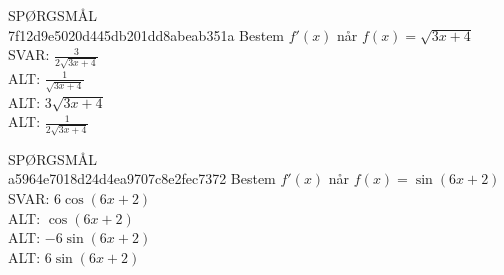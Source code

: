 \documentclass[]{article}
\newcounter{spgcounter}
\newenvironment{question}[2]{\addtocounter{spgcounter}{1} SPØRGSMÅL \thespgcounter\\}{\hspace{50px}}
\newcommand{\answer}[1]{{\color{green} SVAR: #1}\\}
\newcommand{\alt}[1]{{\color{red} ALT: #1}\\}
\begin{document}
    \begin{question}{multi}\id{7f12d9e5020d445db201dd8abeab351a}
    Bestem $f'(x)$ når $f(x)=\sqrt{3x+4}$
    \answer{$\frac{3}{2\sqrt{3x+4}}$}
    \alt{$\frac{1}{\sqrt{3x+4}}$}
    \alt{$3\sqrt{3x+4}$}
    \alt{$\frac{1}{2\sqrt{3x+4}}$}
    \end{question}
    
    \begin{question}{multi}\id{a5964e7018d24d4ea9707c8e2fec7372}
    Bestem $f'(x)$ når $f(x)=\sin(6x+2)$
    \answer{$6\cos(6x+2)$}
    \alt{$\cos(6x+2)$}
    \alt{$-6\sin(6x+2)$}
    \alt{$6\sin(6x+2)$}
\end{question}
\end{document}
